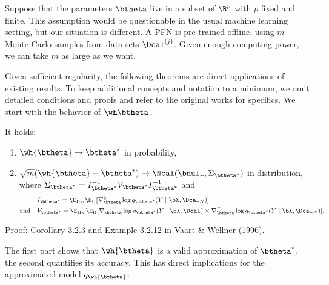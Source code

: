 \documentclass[aspectratio=169,10pt]{beamer}
\newcommand{\currentheading}{\ifx\insertsubsection\empty\insertsection\else\insertsubsection\fi}
\begin{document}
\begin{frame}{\currentheading}
Suppose that the parameters $\btheta$ live in a subset of $\R^p$ with $p$ fixed and finite. This assumption would be questionable in the usual machine learning setting, but our situation is different. A PFN is pre-trained offline, using $m$ Monte-Carlo samples from data sets $\Dcal^{(j)}$. Given enough computing power, we can take $m$ as large as we want.
\end{frame}

\begin{frame}{\currentheading}
\small
Given sufficient regularity, the following theorems are direct applications of existing results. To keep additional concepts and notation to a minimum, we omit detailed conditions and proofs and refer to the original works for specifics. We start with the behavior of $\wh \btheta$.
\begin{theorem}[B.1]\label{thm:asym-theta}
It holds:
\begin{enumerate}
	\item[(i)] $	\wh{\btheta} \to \btheta^* $ in probability,
	\item[(ii)] $\sqrt{m}(\wh{\btheta} - \btheta^*) \to \Ncal(\bnull, \Sigma_{\btheta^*})$ in distribution, where $\Sigma_{\btheta^*} = I_{\btheta^{*}}^{-1} V_{\btheta^*}  I_{\btheta^{*}}^{-1}$ and
	      \begin{align*}
		                        & I_{\btheta^*} =   \E_{\Pi_N}\E_{\Pi}[\nabla_{\btheta}^2 \log q_{\btheta^*}(Y \mid \bX, \Dcal_N)]                                                                 \\
		      \mbox{and}  \quad & V_{\btheta^*} =  \E_{\Pi_N}\E_{\Pi}[\nabla_{\btheta} \log q_{\btheta^*}(Y \mid \bX, \Dcal) \times \nabla_{\btheta}^\top \log q_{\btheta^*}(Y \mid \bX, \Dcal_N)].
	      \end{align*}
\end{enumerate}
\end{theorem}
Proof: Corollary 3.2.3 and Example 3.2.12 in Vaart \& Wellner (1996).
\end{frame}

\begin{frame}{\currentheading}
The first part shows that $\wh{\btheta}$ is a valid approximation of $\btheta^*$, the second quantifies its accuracy. This has direct implications for the approximated model $q_{\wh{\btheta}}$.
\end{frame}
\end{document}
